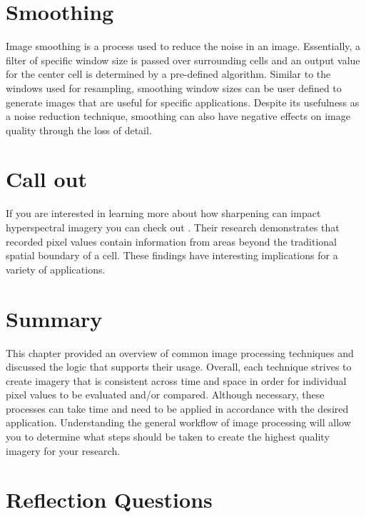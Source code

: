 \documentclass[
]{book}
\begin{document}
\hypertarget{smoothing}{%
\section{Smoothing}\label{smoothing}}

Image smoothing is a process used to reduce the noise in an image.
Essentially, a filter of specific window size is passed over surrounding
cells and an output value for the center cell is determined by a
pre-defined algorithm. Similar to the windows used for resampling,
smoothing window sizes can be user defined to generate images that are
useful for specific applications. Despite its usefulness as a noise
reduction technique, smoothing can also have negative effects on image
quality through the loss of detail.

\hypertarget{call-out-3}{%
\section*{Call out}\label{call-out-3}}

If you are interested in learning more about how sharpening can impact
hyperspectral imagery you can check out \citep{inamdar_characterizing_2020}. Their research
demonstrates that recorded pixel values contain information from areas
beyond the traditional spatial boundary of a cell. These findings have
interesting implications for a variety of applications.

\hypertarget{summary-11}{%
\section{Summary}\label{summary-11}}

This chapter provided an overview of common image processing techniques
and discussed the logic that supports their usage. Overall, each
technique strives to create imagery that is consistent across time and
space in order for individual pixel values to be evaluated and/or
compared. Although necessary, these processes can take time and need to
be applied in accordance with the desired application. Understanding the
general workflow of image processing will allow you to determine what
steps should be taken to create the highest quality imagery for your
research.

\hypertarget{reflection-questions-10}{%
\section*{Reflection Questions}\label{reflection-questions-10}}
\end{document}
